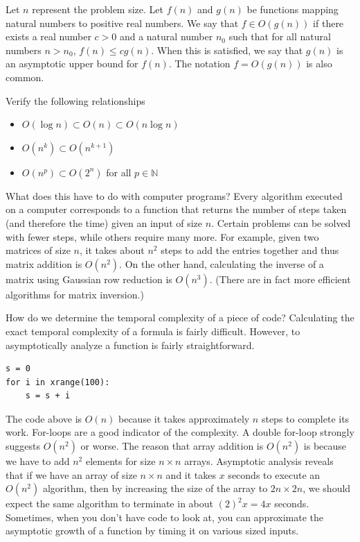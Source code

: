 \begin{definition}
Let $n$ represent the problem size.  Let $f(n)$ and $g(n)$ be functions mapping natural numbers to positive real numbers. We say that $f \in O(g(n))$ if there exists a real
number $c > 0$ and a natural number $n_0$ such that for all natural numbers $n > n_0$,
$f(n) \leq cg(n)$.
When this is satisfied, we say that $g(n)$ is an asymptotic upper bound for $f(n)$.
The notation $f = O(g(n))$ is also common.
\end{definition}

\begin{problem}
Verify the following relationships
\begin{itemize}
\item $O(\log{n}) \subset O(n) \subset O(n\log{n})$
\item $O(n^k) \subset O(n^{k+1})$
\item $O(n^p) \subset O(2^n)$ for all $p \in \mathbb{N}$
\end{itemize}
\end{problem}

What does this have to do with computer programs?
Every algorithm executed on a computer corresponds to a function
that returns the number of steps taken (and therefore the time)
given an input of size $n$.  Certain problems can be solved with fewer steps,
while others require many more.  For example, given two matrices of size $n$,
it takes about $n^2$ steps to add the entries together and thus matrix addition is $O(n^2)$.
On the other hand, calculating the inverse of a matrix using Gaussian
row reduction is $O(n^3)$. (There are in fact more efficient
algorithms for matrix inversion.)

How do we determine the temporal complexity of a piece of code?
Calculating the exact temporal complexity of a formula is fairly difficult.
However, to asymptotically analyze a function is fairly straightforward.
\begin{lstlisting}
s = 0
for i in xrange(100):
    s = s + i
\end{lstlisting}
The code above is $O(n)$ because it takes approximately $n$ steps to complete its work.
For-loops are a good indicator of the complexity.  A double for-loop strongly suggests
$O(n^2)$ or worse.  The reason that array addition is $O(n^2)$ is because we have to add
$n^2$ elements for size $n \times n$ arrays.  Asymptotic analysis reveals that
if we have an array of size $n \times n$ and it takes $x$ seconds to execute an $O(n^2)$ algorithm,
then by increasing the size of the array to $2n \times 2n$, we should expect the same algorithm
to terminate in about $(2)^2 x = 4x$ seconds.  Sometimes, when you don't have code to look at,
you can approximate the asymptotic growth of a function by timing it on various sized inputs.


